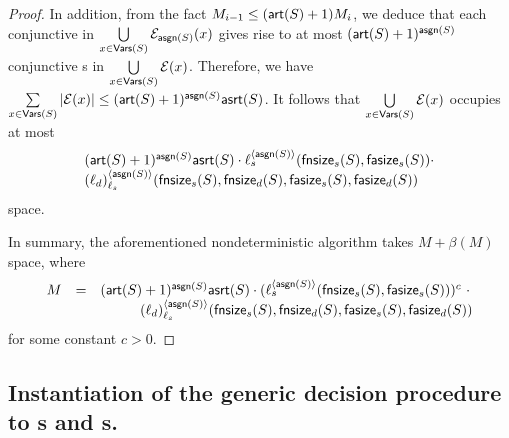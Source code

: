 \begin{proof}
In addition, from the fact $M_{i-1} \le (\mathsf{art}(S)+1)M_i $, we deduce that each conjunctive \SA{} in $\bigcup \limits_{x \in \mathsf{Vars}(S)} \mathcal{E}_{\mathsf{asgn}(S)}(x)$ gives rise to at most $(\mathsf{art}(S)+1)^{\mathsf{asgn}(S)}$ conjunctive \SA{}s in $\bigcup \limits_{x \in \mathsf{Vars}(S)} \mathcal{E}(x)$. Therefore, we have $\sum \limits_{x \in \mathsf{Vars}(S)} |\mathcal{E}(x)| \le (\mathsf{art}(S)+1)^{\mathsf{asgn}(S)} \mathsf{asrt}(S)$. It follows that $\bigcup \limits_{x \in \mathsf{Vars}(S)} \mathcal{E}(x)$ occupies at most 
{\small
\[
\begin{array}{l}
(\mathsf{art}(S)+1)^{\mathsf{asgn}(S)} \mathsf{asrt}(S) \cdot \ell_s^{\langle  \mathsf{asgn}(S) \rangle}(\mathsf{fnsize}_s(S), \mathsf{fasize}_s(S)) \cdot \\
  (\ell_d)^{\langle \mathsf{asgn}(S) \rangle}_{\ell_s}(\mathsf{fnsize}_s(S),  \mathsf{fnsize}_d(S), \mathsf{fasize}_s(S), \mathsf{fasize}_d(S))
\end{array}
\]
}
space. 

In summary, the aforementioned nondeterministic algorithm takes  $M + \beta(M)$ space, where 
%
$$
\begin{array}{l c l}
M & = & (\mathsf{art}(S)+1)^{\mathsf{asgn}(S)}  \mathsf{asrt}(S) \cdot  (\ell_s^{\langle \mathsf{asgn}(S) \rangle}(\mathsf{fnsize}_s(S), \mathsf{fasize}_s(S)))^{c}\ \cdot \\
& &  \hspace{1cm} (\ell_d)^{\langle  \mathsf{asgn}(S) \rangle}_{\ell_s}(\mathsf{fnsize}_s(S),\mathsf{fnsize}_d(S),  \mathsf{fasize}_s(S), \mathsf{fasize}_d(S))
\end{array}
$$
%
for some constant $c > 0$.
\end{proof}


\subsection{Instantiation of the generic decision procedure to \SSPT{}s and \RBSSPT{}s.}



